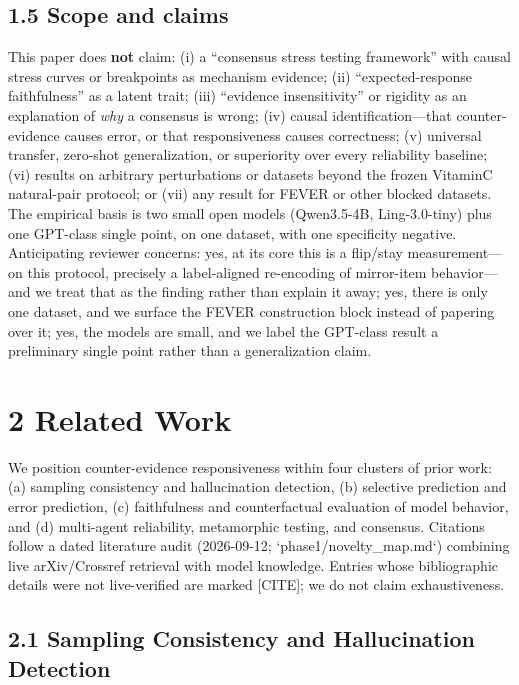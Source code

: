 \documentclass[11pt]{article}
\begin{document}
\subsection{1.5 Scope and claims}

This paper does \textbf{not} claim: (i) a “consensus stress testing framework” with causal stress curves or breakpoints as mechanism evidence; (ii) “expected-response faithfulness” as a latent trait; (iii) “evidence insensitivity” or rigidity as an explanation of \emph{why} a consensus is wrong; (iv) causal identification—that counter-evidence causes error, or that responsiveness causes correctness; (v) universal transfer, zero-shot generalization, or superiority over every reliability baseline; (vi) results on arbitrary perturbations or datasets beyond the frozen VitaminC natural-pair protocol; or (vii) any result for FEVER or other blocked datasets. The empirical basis is two small open models (Qwen3.5-4B, Ling-3.0-tiny) plus one GPT-class single point, on one dataset, with one specificity negative. Anticipating reviewer concerns: yes, at its core this is a flip/stay measurement—on this protocol, precisely a label-aligned re-encoding of mirror-item behavior—and we treat that as the finding rather than explain it away; yes, there is only one dataset, and we surface the FEVER construction block instead of papering over it; yes, the models are small, and we label the GPT-class result a preliminary single point rather than a generalization claim.




\section{2 Related Work}

We position counter-evidence responsiveness within four clusters of prior work: (a) sampling consistency and hallucination detection, (b) selective prediction and error prediction, (c) faithfulness and counterfactual evaluation of model behavior, and (d) multi-agent reliability, metamorphic testing, and consensus. Citations follow a dated literature audit (2026-09-12; `phase1/novelty\_map.md`) combining live arXiv/Crossref retrieval with model knowledge. Entries whose bibliographic details were not live-verified are marked [CITE]; we do not claim exhaustiveness.

\subsection{2.1 Sampling Consistency and Hallucination Detection}
\end{document}
